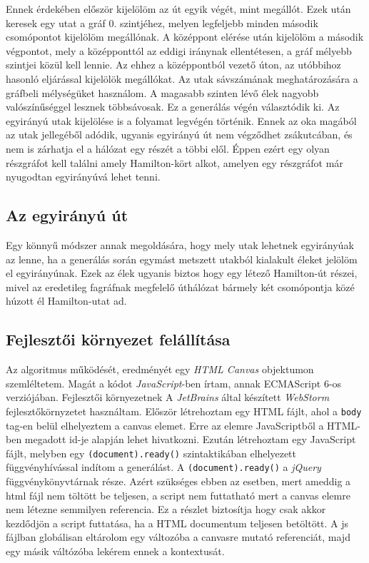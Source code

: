 Ennek érdekében először kijelölöm az út egyik végét, mint megállót. Ezek után keresek egy utat a gráf 0. szintjéhez, melyen legfeljebb minden második csomópontot kijelölöm megállónak. A középpont 
elérése után kijelölöm a második végpontot, mely a középponttól az eddigi iránynak ellentétesen, a gráf mélyebb szintjei közül kell lennie. Az ehhez a középpontból vezető úton, az utóbbihoz hasonló 
eljárással kijelölök megállókat. Az utak sávszámának meghatározására a gráfbeli mélységüket használom. A magasabb szinten lévő élek nagyobb valószínűséggel lesznek többsávosak. Ez a generálás végén választódik
ki. Az egyirányú utak kijelölése is a folyamat legvégén történik. Ennek az oka magából az utak jellegéből adódik, ugyanis egyirányú út nem végződhet zsákutcában, és nem is zárhatja el a hálózat egy részét a többi elől. Éppen ezért egy olyan részgráfot kell találni amely Hamilton-kört alkot, amelyen egy részgráfot már nyugodtan egyirányúvá lehet tenni.

\subsection{Az egyirányú út}

Egy könnyű módszer annak megoldására, hogy mely utak lehetnek egyirányúak az lenne, ha a generálás során egymást metszett utakból kialakult éleket jelölöm el egyirányúnak. Ezek az élek ugyanis biztos hogy egy létező Hamilton-út részei, mivel az eredetileg fagráfnak megfelelő úthálózat bármely két csomópontja közé húzott él Hamilton-utat ad.


\subsection{Fejlesztői környezet felállítása}

Az algoritmus működését, eredményét egy \textit{HTML Canvas} objektumon szemléltetem. Magát a kódot \textit{JavaScript}-ben írtam, annak ECMAScript 6-os verziójában. Fejlesztői környezetnek A \textit{JetBrains} által készített \textit{WebStorm} fejlesztőkörnyzetet használtam. Először
létrehoztam egy HTML fájlt, ahol a \texttt{body} tag-en belül elhelyeztem a canvas elemet. Erre az elemre JavaScriptből a HTML-ben megadott id-je alapján lehet hivatkozni. Ezután létrehoztam egy JavaScript fájlt, melyben egy \texttt{(document).ready()} szintaktikában 
elhelyezett függvényhívással indítom a generálást. A \texttt{(document).ready()} a \textit{jQuery} függvénykönyvtárnak része. Azért szükséges ebben az esetben, mert ameddig a html fájl nem töltött be teljesen, a script nem futtatható mert a canvas elemre nem létezne 
semmilyen referencia. Ez a részlet biztosítja hogy csak akkor kezdődjön a script futtatása, ha a HTML documentum teljesen betöltött. A js fájlban globálisan eltárolom egy változóba a canvasre mutató referenciát, majd egy másik váltózóba lekérem ennek a kontextusát.

